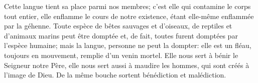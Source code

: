 Cette langue tient sa place parmi nos membres;
	c’est elle qui contamine le corps tout entier,
	elle enflamme le cours de notre existence,
	étant elle-même enflammée par la géhenne.
Toute espèce de bêtes sauvages et d’oiseaux,
		de reptiles et d’animaux marins peut être domptée
	et, de fait, toutes furent domptées par l’espèce humaine;
	mais la langue, personne ne peut la dompter:
	elle est un fléau, toujours en mouvement, remplie d’un venin mortel.
Elle nous sert à bénir le Seigneur notre Père,
	elle nous sert aussi à maudire les hommes,
	qui sont créés à l’image de Dieu.
De la même bouche sortent bénédiction et malédiction.
